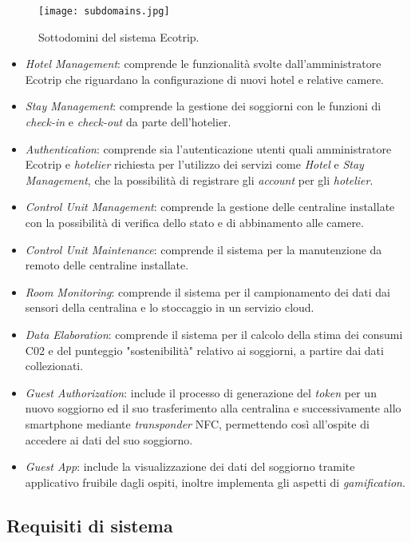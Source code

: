 \begin{figure}[H]
    \texttt{[image: subdomains.jpg]}
    \centering
    \caption[subdomains]{Sottodomini del sistema Ecotrip.}
    \label{fig:subdomains}
\end{figure}
\begin{itemize}
    \item \textit{Hotel Management}: comprende le funzionalità svolte dall'amministratore Ecotrip che riguardano la configurazione di nuovi hotel e relative camere.
    \item \textit{Stay Management}: comprende la gestione dei soggiorni con le funzioni di \textit{check-in} e \textit{check-out} da parte dell'hotelier.
    \item \textit{Authentication}: comprende sia l'autenticazione utenti quali amministratore Ecotrip e \textit{hotelier} richiesta per l'utilizzo dei servizi come \textit{Hotel} e \textit{Stay Management}, che la possibilità di registrare gli \textit{account} per gli \textit{hotelier}.
    \item \textit{Control Unit Management}: comprende la gestione delle centraline installate con la possibilità di verifica dello stato e di abbinamento alle camere.
    \item \textit{Control Unit Maintenance}: comprende il sistema per la manutenzione da remoto delle centraline installate.
    \item \textit{Room Monitoring}: comprende il sistema per il campionamento dei dati dai sensori della centralina e lo stoccaggio in un servizio cloud.
    \item \textit{Data Elaboration}: comprende il sistema per il calcolo della stima dei consumi C02 e del punteggio "sostenibilità" relativo ai soggiorni, a partire dai dati collezionati.
    \item \textit{Guest Authorization}: include il processo di generazione del \textit{token} per un nuovo soggiorno ed il suo trasferimento alla centralina e successivamente allo smartphone mediante \textit{transponder} NFC, permettendo così all'ospite di accedere ai dati del suo soggiorno.
    \item \textit{Guest App}: include la visualizzazione dei dati del soggiorno tramite applicativo fruibile dagli ospiti, inoltre implementa gli aspetti di \textit{gamification}.
\end{itemize}

\subsection{Requisiti di sistema}

